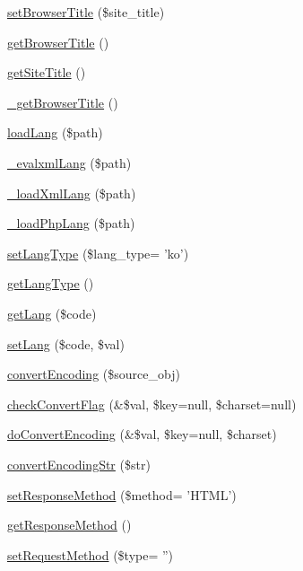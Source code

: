\begin{DoxyCompactItemize}
\hyperlink{classContext_aab07bc95a7a855c4d9608b4ed615807f}{set\+Browser\+Title} (\$site\+\_\+title)
\item 
\hyperlink{classContext_a19f432349a41af2ed36b2cd5e6ba96a5}{get\+Browser\+Title} ()
\item 
\hyperlink{classContext_a0ee79330d3ee12c811cd784e24a7b017}{get\+Site\+Title} ()
\item 
\hyperlink{classContext_ab8f518a596abcbbd70b20dd46442ae0a}{\+\_\+get\+Browser\+Title} ()
\item 
\hyperlink{classContext_a7b22a741ff804e5cdaafd952273bd70c}{load\+Lang} (\$path)
\item 
\hyperlink{classContext_a45bd19b6edf9e66582842a3f6e50fa4b}{\+\_\+evalxml\+Lang} (\$path)
\item 
\hyperlink{classContext_af3ba6aaa8fa5f6c758b7716ec7135ab3}{\+\_\+load\+Xml\+Lang} (\$path)
\item 
\hyperlink{classContext_a3ad6fc7782e7234fe77357da28218310}{\+\_\+load\+Php\+Lang} (\$path)
\item 
\hyperlink{classContext_ad70a3a0db09c75a9eb20e8f5f1df305f}{set\+Lang\+Type} (\$lang\+\_\+type= 'ko')
\item 
\hyperlink{classContext_ae75d6f4064d09e48d0d76614b6997e29}{get\+Lang\+Type} ()
\item 
\hyperlink{classContext_a9af9269b04542f7462d27a63226e0ff3}{get\+Lang} (\$code)
\item 
\hyperlink{classContext_a3615e0bc64da445f6165e97785c7d94c}{set\+Lang} (\$code, \$val)
\item 
\hyperlink{classContext_a9ef4f41a9ae7108ea7560162399c77a8}{convert\+Encoding} (\$source\+\_\+obj)
\item 
\hyperlink{classContext_ac2bf2f97195aae6b2cd6ba559bbcb18f}{check\+Convert\+Flag} (\&\$val, \$key=null, \$charset=null)
\item 
\hyperlink{classContext_ade825b985221f5bef69919e30e9ed248}{do\+Convert\+Encoding} (\&\$val, \$key=null, \$charset)
\item 
\hyperlink{classContext_a0464dcbadfd67f62265fac90546d3bf8}{convert\+Encoding\+Str} (\$str)
\item 
\hyperlink{classContext_afc58a19e296dfc70a95648f35bb0f3a9}{set\+Response\+Method} (\$method= 'H\+T\+M\+L')
\item 
\hyperlink{classContext_a1d02a15209360034cd719d8b08cb5061}{get\+Response\+Method} ()
\item 
\hyperlink{classContext_aa47d184757d451009f0597153d323ccc}{set\+Request\+Method} (\$type= '')

\end{DoxyCompactItemize}
